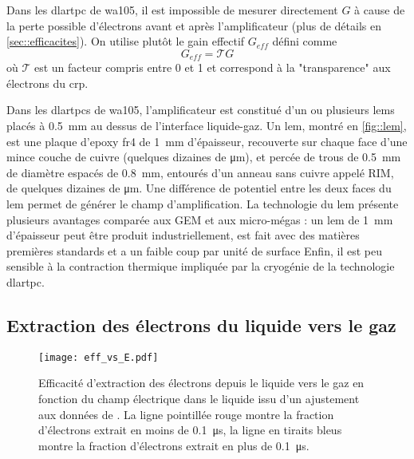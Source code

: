      Dans les \gls{dlartpc} de \gls{wa105}, il est impossible de mesurer directement $G$ à cause de la perte possible d'électrons avant et après l'amplificateur (plus de détails en \autoref{sec::efficacites}). On utilise plutôt le gain effectif $G_{eff}$ défini comme
      \begin{equation}\label{eq::gain_eff}
        G _{eff}= \mathcal{T}G
      \end{equation}
      où $\mathcal{T}$ est un facteur compris entre 0 et 1 et correspond à la "transparence" aux électrons du \gls{crp}. 

      Dans les \glspl{dlartpc} de \gls{wa105}, l'amplificateur est constitué d'un ou plusieurs \glspl{lem} placés à \SI{0.5}{\milli\meter} au dessus de l'interface liquide-gaz. Un \gls{lem}, montré en \autoref{fig::lem}, est une plaque d'epoxy \gls{fr4} de \SI{1}{\milli\meter} d'épaisseur, recouverte sur chaque face d'une mince couche de cuivre (quelques dizaines de \si{\micro\meter}), et percée de trous de \SI{0.5}{\milli\meter} de diamètre espacés de \SI{0.8}{\milli\meter}, entourés d'un anneau sans cuivre appelé RIM, de quelques dizaines de \si{\micro\meter}. Une différence de potentiel entre les deux faces du \gls{lem} permet de générer le champ d'amplification. La technologie du \gls{lem} présente plusieurs avantages comparée aux GEM et aux micro-mégas : un \gls{lem} de \SI{1}{\milli\meter} d'épaisseur peut être produit industriellement, est fait avec des matières premières standards et a un faible coup par unité de surface Enfin, il est peu sensible à la contraction thermique impliquée par la cryogénie de la technologie \gls{dlartpc}.

    \subsection{Extraction des électrons du liquide vers le gaz}\label{sec::extraction}

      \begin{figure}[htbp]
        \centering
        \texttt{[image: eff\_vs\_E.pdf]}
        \caption[Efficacité d'extraction des électrons depuis le liquide vers le gaz en fonction du champ électrique.]{\label{fig::guschin}Efficacité d'extraction des électrons depuis le liquide vers le gaz en fonction du champ électrique dans le liquide issu d'un ajustement aux données de \cite{guschin}. La ligne pointillée rouge montre la fraction d'électrons extrait en moins de \SI{0.1}{\micro\second}, la ligne en tiraits bleus montre la fraction d'électrons extrait en plus de \SI{0.1}{\micro\second}.}
      \end{figure}

